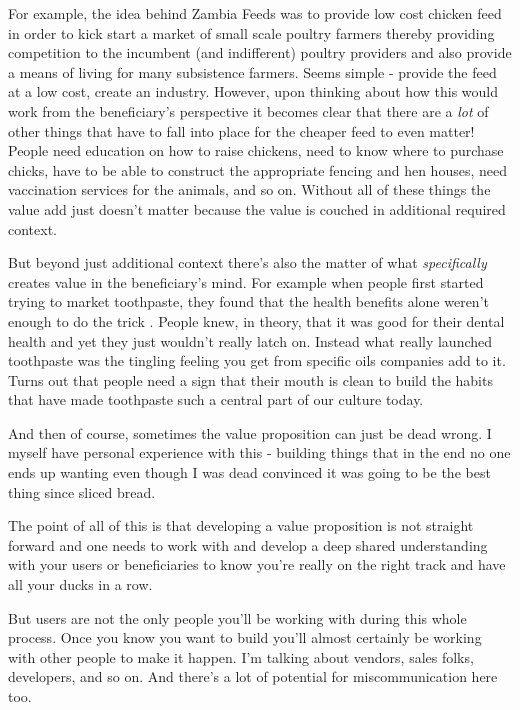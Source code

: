 \documentclass[11pt,a5paper]{book}
\begin{document}
For example, the idea behind Zambia Feeds \cite{macmillan} was to provide low cost chicken feed in order to kick start a market of small scale poultry farmers thereby providing competition to the incumbent (and indifferent) poultry providers and also provide a means of living for many subsistence farmers. Seems simple - provide the feed at a low cost, create an industry. However, upon thinking about how this would work from the beneficiary's perspective it becomes clear that there are a \textit{lot} of other things that have to fall into place for the cheaper feed to even matter! People need education on how to raise chickens, need to know where to purchase chicks, have to be able to construct the appropriate fencing and hen houses, need vaccination services for the animals, and so on. Without all of these things the value add just doesn't matter because the value is couched in additional required context. 
\newline

But beyond just additional context there's also the matter of what \textit{specifically} creates value in the beneficiary's mind. For example when people first started trying to market toothpaste, they found that the health benefits alone weren't enough to do the trick \cite{duhigg}. People knew, in theory, that it was good for their dental health and yet they just wouldn't really latch on. Instead what really launched toothpaste was the tingling feeling you get from specific oils companies add to it. Turns out that people need a sign that their mouth is clean to build the habits that have made toothpaste such a central part of our culture today. 
\newline

And then of course, sometimes the value proposition can just be dead wrong. I myself have personal experience with this - building things that in the end no one ends up wanting even though I was dead convinced it was going to be the best thing since sliced bread.
\newline

The point of all of this is that developing a value proposition is not straight forward and one needs to work with and develop a deep shared understanding with your users or beneficiaries to know you're really on the right track and have all your ducks in a row.
\newline

But users are not the only people you'll be working with during this whole process. Once you know you want to build you'll almost certainly be working with other people to make it happen. I'm talking about vendors, sales folks, developers, and so on. And there's a lot of potential for miscommunication here too. 
\newline
\end{document}
